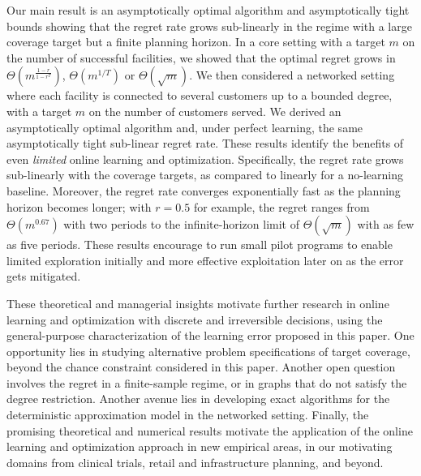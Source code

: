 \documentclass[nonblindrev]{informs3noheader}
\begin{document}
Our main result is an asymptotically optimal algorithm and asymptotically tight bounds showing that the regret rate grows sub-linearly in the regime with a large coverage target but a finite planning horizon. In a core setting with a target $m$ on the number of successful facilities, we showed that the optimal regret grows in $\Theta\left(m^{\frac{1-r}{1-r^T}}\right)$, $\Theta\left(m^{1/T}\right)$ or $\Theta\left(\sqrt m\right)$. We then considered a networked setting where each facility is connected to several customers up to a bounded degree, with a target $m$ on the number of customers served. We derived an asymptotically optimal algorithm and, under perfect learning, the same asymptotically tight sub-linear regret rate. These results identify the benefits of even \emph{limited} online learning and optimization. Specifically, the regret rate grows sub-linearly with the coverage targets, as compared to linearly for a no-learning baseline. Moreover, the regret rate converges exponentially fast as the planning horizon becomes longer; with $r=0.5$ for example, the regret ranges from $\Theta\left(m^{0.67}\right)$ with two periods to the infinite-horizon limit of $\Theta\left(\sqrt m\right)$ with as few as five periods. These results encourage to run small pilot programs to enable limited exploration initially and more effective exploitation later on as the error gets mitigated.

These theoretical and managerial insights motivate further research in online learning and optimization with discrete and irreversible decisions, using the general-purpose characterization of the learning error proposed in this paper. One opportunity lies in studying alternative problem specifications of target coverage, beyond the chance constraint considered in this paper. Another open question involves the regret in a finite-sample regime, or in graphs that do not satisfy the degree restriction. Another avenue lies in developing exact algorithms for the deterministic approximation model in the networked setting. Finally, the promising theoretical and numerical results motivate the application of the online learning and optimization approach in new empirical areas, in our motivating domains from clinical trials, retail and infrastructure planning, and beyond.




\newpage

\ECSwitch
{}
\end{document}
